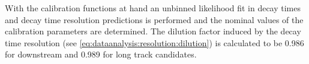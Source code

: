 With the calibration functions at hand an unbinned likelihood fit in decay
times and decay time resolution predictions is performed and the nominal
values of the calibration parameters are determined. The dilution factor
induced by the decay time resolution (see
\cref{eq:dataanalysis:resolution:dilution}) is calculated to be \num{0.986}
for downstream and \num{0.989} for long track candidates.
